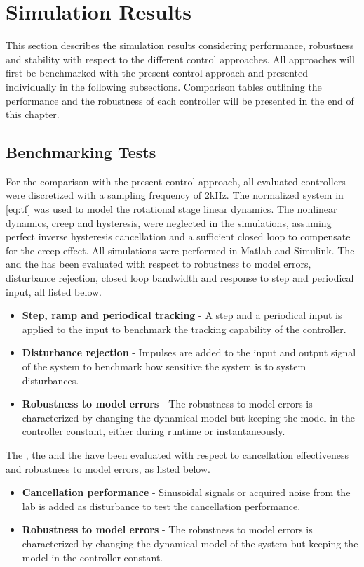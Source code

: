 \chapter{Simulation Results}\label{cha:result}
This section describes the simulation results considering performance, robustness and stability with respect to the different control approaches. All approaches will first be benchmarked with the present control approach and presented individually in the following subsections. Comparison tables outlining the performance and the robustness of each controller will be presented in the end of this chapter.

\section{Benchmarking Tests}
For the comparison with the present control approach, all evaluated controllers were discretized with a sampling frequency of 2kHz. The normalized system in \eqref{eq:tf} was used to model the rotational stage linear dynamics. The nonlinear dynamics, creep and hysteresis, were neglected in the simulations, assuming perfect inverse hysteresis cancellation and a sufficient closed loop to compensate for the creep effect. All simulations were performed in Matlab and Simulink. The \abbrMRACPE and the \abbrIRC has been evaluated with respect to robustness to model errors, disturbance rejection, closed loop bandwidth and response to step and periodical input, all listed below.

\begin{itemize}
\item {\bf Step, ramp and periodical tracking} - A step and a periodical input is applied to the input to benchmark the tracking capability of the controller.
\item {\bf Disturbance rejection} - Impulses are added to the input and output signal of the system to benchmark how sensitive the system is to system disturbances.
\item {\bf Robustness to model errors} - The robustness to model errors is characterized by changing the dynamical model but keeping the model in the controller constant, either during runtime or instantaneously.
\end{itemize}

The \abbrIMP, the \abbrFDC and the \abbrRFDC have been evaluated with respect to cancellation effectiveness and robustness to model errors, as listed below.

\begin{itemize}
\item {\bf Cancellation performance} -  Sinusoidal signals or acquired noise from the lab is added as disturbance to test the cancellation performance.
\item {\bf Robustness to model errors} - The robustness to model errors is characterized by changing the dynamical model of the system but keeping the model in the controller constant.
\end{itemize}

